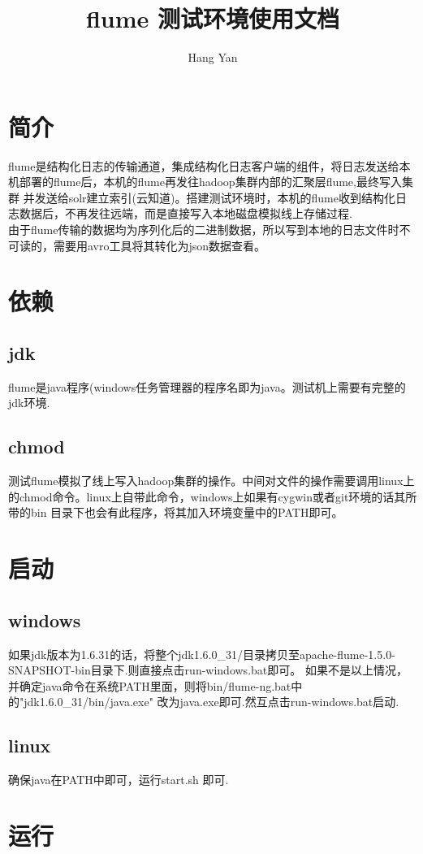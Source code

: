 \documentclass{article}
\title{flume 测试环境使用文档}
\author{Hang Yan}
\begin{document}
\maketitle
\newpage
\section{简介}
flume是结构化日志的传输通道，集成结构化日志客户端的组件，将日志发送给本机部署的flume后，本机的flume再发往hadoop集群内部的汇聚层flume,最终写入集群
并发送给solr建立索引(云知道)。搭建测试环境时，本机的flume收到结构化日志数据后，不再发往远端，而是直接写入本地磁盘模拟线上存储过程. \\
由于flume传输的数据均为序列化后的二进制数据，所以写到本地的日志文件时不可读的，需要用avro工具将其转化为json数据查看。
\section{依赖}
\subsection{jdk}
flume是java程序(windows任务管理器的程序名即为java。测试机上需要有完整的jdk环境.
\subsection{chmod}
测试flume模拟了线上写入hadoop集群的操作。中间对文件的操作需要调用linux上的chmod命令。linux上自带此命令，windows上如果有cygwin或者git环境的话其所带的bin
目录下也会有此程序，将其加入环境变量中的PATH即可。

\section{启动}
\subsection{windows}
如果jdk版本为1.6.31的话，将整个jdk1.6.0\_31/目录拷贝至apache-flume-1.5.0-SNAPSHOT-bin目录下.则直接点击run-windows.bat即可。
如果不是以上情况，并确定java命令在系统PATH里面，则将bin/flume-ng.bat中的"jdk1.6.0\_31/bin/java.exe" 改为java.exe即可.然互点击run-windows.bat启动.

\subsection{linux}
确保java在PATH中即可，运行start.sh 即可.

\section{运行}
\end{document}
